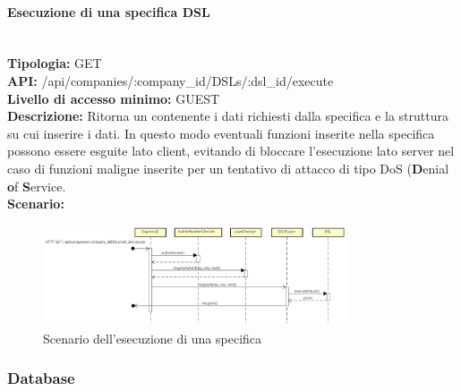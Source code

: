 \paragraph{Esecuzione di una specifica DSL}\mbox{}\\
\textbf{Tipologia:} GET \\
\textbf{API:} /api/companies/:company\_id/DSLs/:dsl\_id/execute \\
\textbf{Livello di accesso minimo:} GUEST \\
\textbf{Descrizione:} Ritorna un  contenente i dati richiesti dalla specifica  e la struttura su cui inserire i dati. In questo modo eventuali funzioni inserite nella specifica  possono essere esguite lato client, evitando di bloccare l'esecuzione lato server nel caso di funzioni maligne inserite per un tentativo di attacco di tipo DoS (\textbf{D}enial \textbf{o}f \textbf{S}ervice. \\
\textbf{Scenario:} 
\begin{figure}[H]
\centering
\includegraphics[width=0.8\textwidth]{res/sections/backend/sequence/(GET)dslByIDex.png}
\caption{Scenario dell'esecuzione di una specifica }
\end{figure}

\newpage
\subsubsection{Database}
